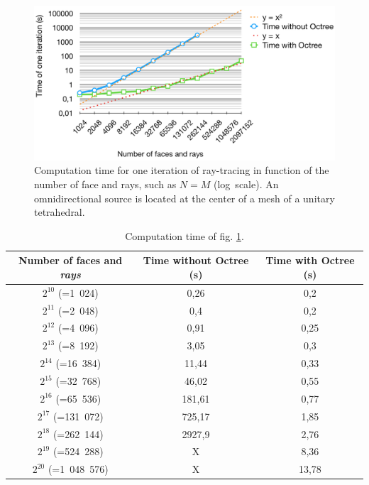 \documentclass[AMA,STIX1COL]{WileyNJD-v2}
\begin{document}
\begin{figure}[h]
\centering
	\includegraphics[width=0.8\linewidth]{times}
	\caption{Computation time for one iteration of ray-tracing in function of the number of face and rays, such as $N = M$ (log~scale). An omnidirectional source is located at the center of a mesh of a unitary tetrahedral.}
	\label{times}
\end{figure}
%
\begin{table}[h]
\centering
	\begin{tabular}{| c | c | c |}
		\hline
		Number of faces and \textit{rays} & Time \textbf{without} Octree (s) & Time \textbf{with} Octree (s)\\
		  \hline
		  \hline
		   $2^{10}$ (=1~024) & 0,26 &	0,2 \\
		   \hline
		$2^{11}$ (=2~048)  & 0,4	& 0,2 \\
		   \hline
		$2^{12}$ (=4~096) & 0,91	& 0,25\\
		   \hline
		$2^{13}$ (=8~192) & 3,05 &	0,3\\
		   \hline
		$2^{14}$ (=16~384) & 11,44	&0,33\\
		   \hline
		$2^{15}$ (=32~768) & 46,02	&0,55 \\
		     \hline
		    $2^{16}$ (=65~536) & 181,61	& 0,77\\
		   \hline
		$2^{17}$ (=131~072) & 725,17	& 1,85\\
		\hline
		$2^{18}$ (=262~144) & 2927,9 & 2,76 \\
		\hline
		$2^{19}$ (=524~288) & X & 8,36 \\
		\hline
		$2^{20}$ (=1~048~576) & X & 13,78 \\
		\hline
	 \end{tabular}
	\caption{Computation time of fig. \ref{times}.}
	\label{tabComplexite}
\end{table}
\end{document}
